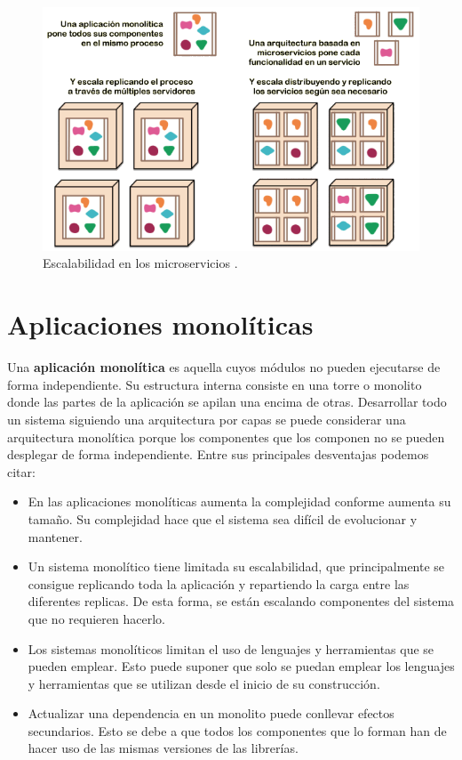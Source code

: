 \documentclass[11pt,spanish,listoffigures]{tfgetsinf}
\begin{document}
\begin{figure}[h]
\centering
\includegraphics[scale=1]{microservices_escaling_ES}
\caption{Escalabilidad en los microservicios \cite{Lewis2014}.}
\label{fig:microservices_escaling_ES}
\end{figure}

\section{Aplicaciones monolíticas}

Una \textbf{aplicación monolítica} \cite{Mazzara2017} es aquella cuyos módulos no pueden ejecutarse de forma independiente. Su estructura interna consiste en una torre o monolito donde las partes de la aplicación se apilan una encima de otras. Desarrollar todo un sistema siguiendo una arquitectura por capas se puede considerar una arquitectura monolítica porque los componentes que los componen no se pueden desplegar de forma independiente. Entre sus principales desventajas podemos citar:

\begin{itemize}

\item En las aplicaciones monolíticas aumenta la complejidad conforme aumenta su  tamaño. Su complejidad hace que el sistema sea difícil de evolucionar y mantener.

\item Un sistema monolítico tiene limitada su escalabilidad, que principalmente se consigue replicando toda la aplicación y repartiendo la carga entre las diferentes replicas. De esta forma, se están escalando componentes del sistema que no requieren hacerlo.

\item Los sistemas monolíticos limitan el uso de lenguajes y herramientas que se pueden emplear. Esto puede suponer que solo se puedan emplear los lenguajes y herramientas que se utilizan desde el inicio de su construcción.

\item Actualizar una dependencia en un monolito puede conllevar efectos secundarios. Esto se debe a que todos los componentes que lo forman han de hacer uso de las mismas versiones de las librerías.

\end{itemize}
\end{document}
